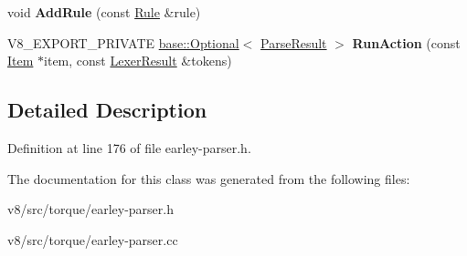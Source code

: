 \begin{DoxyCompactItemize}
void {\bfseries Add\+Rule} (const \mbox{\hyperlink{classv8_1_1internal_1_1torque_1_1Rule}{Rule}} \&rule)
\item 
\mbox{\label{classv8_1_1internal_1_1torque_1_1Symbol_ac2308c55a1c418f2a75a721720f39a8a}} 
V8\+\_\+\+E\+X\+P\+O\+R\+T\+\_\+\+P\+R\+I\+V\+A\+TE \mbox{\hyperlink{classv8_1_1base_1_1Optional}{base\+::\+Optional}}$<$ \mbox{\hyperlink{classv8_1_1internal_1_1torque_1_1ParseResult}{Parse\+Result}} $>$ {\bfseries Run\+Action} (const \mbox{\hyperlink{classv8_1_1internal_1_1torque_1_1Item}{Item}} $\ast$item, const \mbox{\hyperlink{structv8_1_1internal_1_1torque_1_1LexerResult}{Lexer\+Result}} \&tokens)
\end{DoxyCompactItemize}


\subsection{Detailed Description}


Definition at line 176 of file earley-\/parser.\+h.



The documentation for this class was generated from the following files\+:\begin{DoxyCompactItemize}
\item 
v8/src/torque/earley-\/parser.\+h\item 
v8/src/torque/earley-\/parser.\+cc\end{DoxyCompactItemize}
